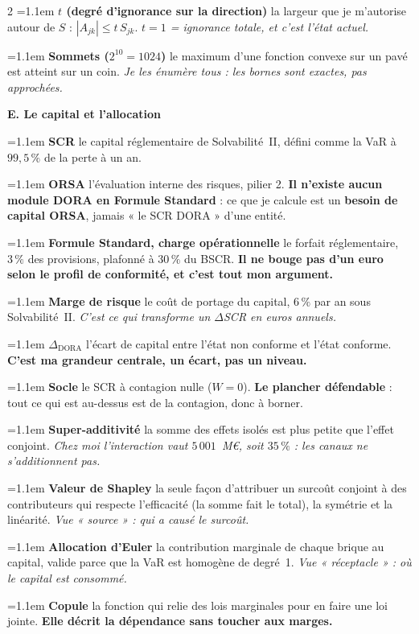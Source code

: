\documentclass[9pt,a4paper]{article}
\newcommand{\n}[1]{\textbf{#1}}
\newcommand{\dfn}[2]{\noindent\hangindent=1.1em\hangafter=1
  {\color{warm}\bfseries #1} \textemdash{} #2\par\smallskip}
\begin{document}
\begin{multicols}{2}
\dfn{$t$ (degré d'ignorance sur la direction)}{la largeur que je m'autorise autour de $S$ :
$|A_{jk}|\le t\,S_{jk}$. \emph{$t=1$ = ignorance totale, et c'est l'état actuel.}}

\dfn{Sommets ($2^{10}=1024$)}{le maximum d'une fonction convexe sur un pavé est atteint sur un
coin. \emph{Je les énumère tous : les bornes sont exactes, pas approchées.}}

\vspace{3pt}
{\color{navy}\bfseries E. Le capital et l'allocation}

\dfn{SCR}{le capital réglementaire de Solvabilité~II, défini comme la VaR à $99{,}5\,\%$ de
la perte à un an.}

\dfn{ORSA}{l'évaluation interne des risques, pilier 2. \n{Il n'existe aucun module DORA en
Formule Standard} : ce que je calcule est un \n{besoin de capital ORSA}, jamais « le SCR
DORA » d'une entité.}

\dfn{Formule Standard, charge opérationnelle}{le forfait réglementaire, $3\,\%$ des
provisions, plafonné à $30\,\%$ du BSCR. \n{Il ne bouge pas d'un euro selon le profil de
conformité, et c'est tout mon argument.}}

\dfn{Marge de risque}{le coût de portage du capital, $6\,\%$ par an sous Solvabilité~II.
\emph{C'est ce qui transforme un $\Delta$SCR en euros annuels.}}

\dfn{$\Delta_{\text{DORA}}$}{l'écart de capital entre l'état non conforme et l'état conforme.
\n{C'est ma grandeur centrale, un écart, pas un niveau.}}

\dfn{Socle}{le SCR à contagion nulle ($W=0$). \n{Le plancher défendable} : tout ce qui est
au-dessus est de la contagion, donc à borner.}

\dfn{Super-additivité}{la somme des effets isolés est plus petite que l'effet conjoint.
\emph{Chez moi l'interaction vaut $5\,001$~M\euro, soit $35\,\%$ : les canaux ne
s'additionnent pas.}}

\dfn{Valeur de Shapley}{la seule façon d'attribuer un surcoût conjoint à des contributeurs
qui respecte l'efficacité (la somme fait le total), la symétrie et la linéarité. \emph{Vue
« source » : qui a causé le surcoût.}}

\dfn{Allocation d'Euler}{la contribution marginale de chaque brique au capital, valide parce
que la VaR est homogène de degré~1. \emph{Vue « réceptacle » : où le capital est consommé.}}

\dfn{Copule}{la fonction qui relie des lois marginales pour en faire une loi jointe.
\n{Elle décrit la dépendance sans toucher aux marges.}}


\end{multicols}
\end{document}
